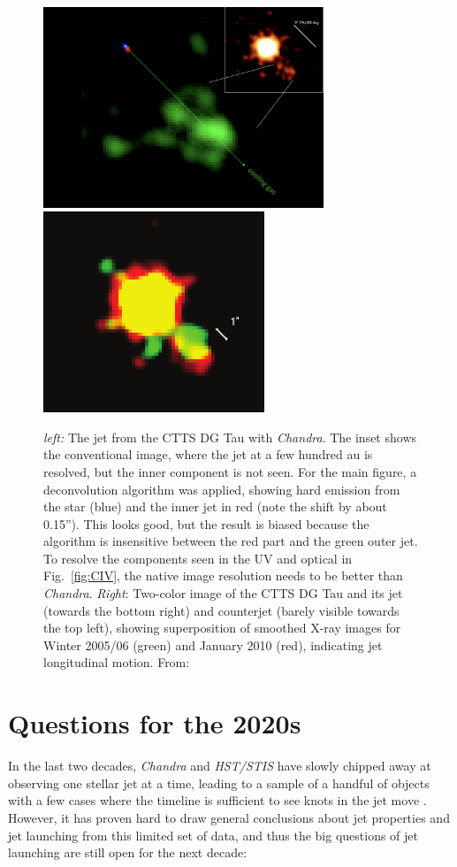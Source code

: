 \documentclass[12pt]{article}
\begin{document}
\begin{figure}[htb]
\centering
\includegraphics[height=6cm]{xjet.png}
\includegraphics[height=6cm]{xjetmotion.png}
\caption{\emph{left:} The jet from the CTTS DG Tau with \emph{Chandra}. The
inset shows the conventional image, where the jet at a few hundred au is
resolved, but the inner component is not seen. For the main figure, a
deconvolution algorithm was applied, showing hard emission from the star
(blue) and the inner jet in red (note the shift by about 0.15”). This looks
good, but the result is biased because the algorithm is insensitive between
the red part and the green outer jet. To resolve the components seen in the
UV and optical in Fig.~\ref{fig:CIV}, the native image resolution needs to be
better than \emph{Chandra}. \emph{Right}: Two-color image of the CTTS DG Tau and its jet (towards the bottom right) and counterjet (barely visible towards the top left), showing superposition of smoothed X-ray
images for Winter 2005/06 (green) and January 2010 (red), indicating jet
longitudinal motion. From: }
\label{fig:Xray}
\end{figure}

\section{Questions for the 2020s}
In the last two decades, \emph{Chandra} and \emph{HST/STIS} have slowly chipped away at observing one stellar jet at a time, leading to a sample of a handful of objects with a few cases where the timeline is sufficient to see knots in the jet move \citep[e.g.][]{2011A&A...530A.123S}. However, it has proven hard to draw general conclusions about jet properties and jet launching from this limited set of data, and thus the big questions of jet launching are still open for the next decade:
\end{document}
